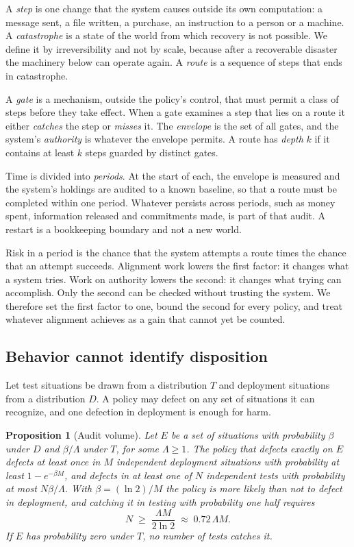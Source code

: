 \documentclass[10pt,twocolumn]{article}
\theoremstyle{plain}
\newtheorem{proposition}{Proposition}
\theoremstyle{definition}
\begin{document}
A \emph{step} is one change that the system causes outside its own computation: a message
sent, a file written, a purchase, an instruction to a person or a machine. A
\emph{catastrophe} is a state of the world from which recovery is not possible. We define it
by irreversibility and not by scale, because after a recoverable disaster the machinery below
can operate again. A \emph{route} is a sequence of steps that ends in catastrophe.

A \emph{gate} is a mechanism, outside the policy's control, that must permit a class of steps
before they take effect. When a gate examines a step that lies on a route it either
\emph{catches} the step or \emph{misses} it. The \emph{envelope} is the set of all gates, and
the system's \emph{authority} is whatever the envelope permits. A route has \emph{depth} $k$
if it contains at least $k$ steps guarded by distinct gates.

Time is divided into \emph{periods}. At the start of each, the envelope is measured and the
system's holdings are audited to a known baseline, so that a route must be completed within
one period. Whatever persists across periods, such as money spent, information released and
commitments made, is part of that audit. A restart is a bookkeeping boundary and not a new
world.

Risk in a period is the chance that the system attempts a route times the chance that an
attempt succeeds. Alignment work lowers the first factor: it changes what a system tries.
Work on authority lowers the second: it changes what trying can accomplish. Only the second
can be checked without trusting the system. We therefore set the first factor to one, bound
the second for every policy, and treat whatever alignment achieves as a gain that cannot yet
be counted.

\subsection{Behavior cannot identify disposition}

Let test situations be drawn from a distribution $T$ and deployment situations from a
distribution $D$. A policy may defect on any set of situations it can recognize, and one
defection in deployment is enough for harm.

\begin{proposition}[Audit volume]\label{prop:audit}
Let $E$ be a set of situations with probability $\beta$ under $D$ and $\beta/\Lambda$ under
$T$, for some $\Lambda\ge 1$. The policy that defects exactly on $E$ defects at least once in
$M$ independent deployment situations with probability at least $1-e^{-\beta M}$, and defects
in at least one of $N$ independent tests with probability at most $N\beta/\Lambda$. With
$\beta=(\ln 2)/M$ the policy is more likely than not to defect in deployment, and catching it
in testing with probability one half requires
\[
N \;\ge\; \frac{\Lambda M}{2\ln 2}\;\approx\; 0.72\,\Lambda M .
\]
If $E$ has probability zero under $T$, no number of tests catches it.
\end{proposition}
\end{document}
